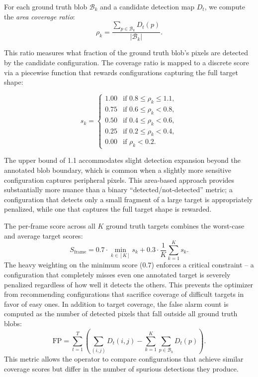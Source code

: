 \documentclass[conf]{new-aiaa}
\begin{document}
\label{sec:scoring}

For each ground truth blob $\mathcal{B}_k$ and a candidate detection map $D_t$, we compute the \emph{area coverage ratio}:
\begin{equation}
    \rho_k = \frac{\sum_{p \in \mathcal{B}_k} D_t(p)}{|\mathcal{B}_k|}. \label{eq:coverage}
\end{equation}

This ratio measures what fraction of the ground truth blob's pixels are detected by the candidate configuration. The coverage ratio is mapped to a discrete score via a piecewise function that rewards configurations capturing the full target shape:

\begin{equation}
    s_k = \begin{cases}
        1.00 & \text{if } 0.8 \le \rho_k \le 1.1, \\
        0.75 & \text{if } 0.6 \le \rho_k < 0.8, \\
        0.50 & \text{if } 0.4 \le \rho_k < 0.6, \\
        0.25 & \text{if } 0.2 \le \rho_k < 0.4, \\
        0.00 & \text{if } \rho_k < 0.2.
    \end{cases} \label{eq:score_zones}
\end{equation}


The upper bound of 1.1 accommodates slight detection expansion beyond the annotated blob boundary, which is common when a slightly more sensitive configuration captures peripheral pixels. This area-based approach provides substantially more nuance than a binary ``detected/not-detected'' metric; a configuration that detects only a small fragment of a large target is appropriately penalized, while one that captures the full target shape is rewarded.

The per-frame score across all $K$ ground truth targets combines the worst-case and average target scores:
\begin{equation}
    S_{\mathrm{frame}} = 0.7 \cdot \min_{k \in [K]} s_k + 0.3 \cdot \frac{1}{K}\sum_{k=1}^{K} s_k. \label{eq:frame_score}
\end{equation}
The heavy weighting on the minimum score (0.7) enforces a critical constraint -- a configuration that completely misses even one annotated target is severely penalized regardless of how well it detects the others. This prevents the optimizer from recommending configurations that sacrifice coverage of difficult targets in favor of easy ones. In addition to target coverage, the false alarm count is computed as the number of detected pixels that fall outside all ground truth blobs:
\begin{equation}
    \mathrm{FP} = \sum_{t=1}^{T}\left(\sum_{(i,j)} D_t(i,j) - \sum_{k=1}^{K}\sum_{p \in \mathcal{B}_k} D_t(p)\right). \label{eq:fp}
\end{equation}
This metric allows the operator to compare configurations that achieve similar coverage scores but differ in the number of spurious detections they produce.
\end{document}
